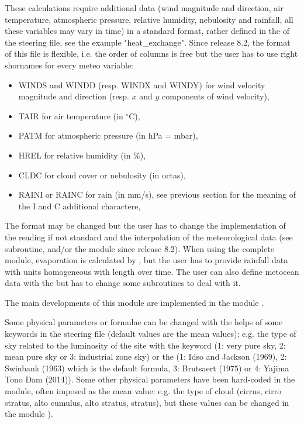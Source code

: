 These calculations require additional data (wind magnitude and direction, air
temperature, atmospheric pressure, relative humidity, nebulosity and rainfall,
all these variables may vary in time) in a standard format, rather defined
in the  of the  steering file,
see the example "heat\_exchange".
Since release 8.2, the format of this file is flexible, i.e. the order of
columns is free but the user has to use right shornames for every meteo variable:
\begin{itemize}
\item WINDS and WINDD (resp. WINDX and WINDY) for wind velocity magnitude and
direction (resp. $x$ and $y$ components of wind velocity),
\item TAIR for air temperature (in $^{\circ}$C),
\item PATM for atmospheric pressure (in hPa = mbar),
\item HREL for relative humidity (in \%),
\item CLDC for cloud cover or nebulosity (in octas),
\item RAINI or RAINC for rain (in mm/s), see previous section for the meaning
of the I and C additional charactere,
\end{itemize}

The format may be changed but the user has to change the implementation of the
reading if not standard and the interpolation of the meteorological data
(see  subroutine, and/or the  module
since release 8.2).
When using the complete module, evaporation is calculated by , but
the user has to provide rainfall data with units homogeneous with length over
time.
The user can also define metocean data with the
 but has to change some subroutines
to deal with it.

The main developments of this module are implemented in the module
.

Some physical parameters or formulae can be changed with the helps of some
keywords in the \waqtel steering file (default values are the mean values): e.g.
the type of sky related to the luminosity of the site with the \waqtel keyword
 (1: very pure sky, 2: mean pure sky or 3:
industrial zone sky) or the 
(1: Idso and Jackson (1969), 2: Swinbank (1963) which is the default formula,
3: Brutsaert (1975) or 4: Yajima Tono Dam (2014)).
Some other physical parameters have been hard-coded in the module, often
imposed as the mean value: e.g. the type of cloud (cirrus,
cirro stratus, alto cumulus, alto stratus, stratus), but these values can be
changed in the module ).

